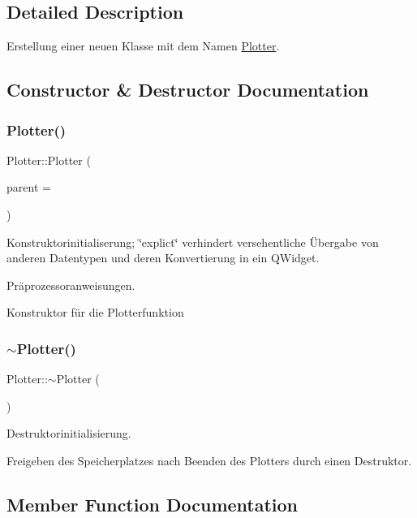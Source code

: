 \subsection{Detailed Description}
Erstellung einer neuen Klasse mit dem Namen \hyperlink{class_plotter}{Plotter}. 

\subsection{Constructor \& Destructor Documentation}
\mbox{\label{class_plotter_a367b6890c36910a27ec710ac3693e64b}} 
\subsubsection{\texorpdfstring{Plotter()}{Plotter()}}
{\footnotesize\ttfamily Plotter\+::\+Plotter (\begin{DoxyParamCaption}\item[{Q\+Widget $\ast$}]{parent = {} }\end{DoxyParamCaption})\hspace{0.3cm}{\ttfamily [explicit]}}



Konstruktorinitialiserung; \char`\"{}explict\char`\"{} verhindert versehentliche Übergabe von anderen Datentypen und deren Konvertierung in ein Q\+Widget. 

Präprozessoranweisungen.

Konstruktor für die Plotterfunktion \mbox{\label{class_plotter_acd0883f9597a6b3bfcca0fce926809a0}} 
\subsubsection{\texorpdfstring{$\sim$\+Plotter()}{~Plotter()}}
{\footnotesize\ttfamily Plotter\+::$\sim$\+Plotter (\begin{DoxyParamCaption}{ }\end{DoxyParamCaption})}



Destruktorinitialisierung. 

Freigeben des Speicherplatzes nach Beenden des Plotters durch einen Destruktor. 

\subsection{Member Function Documentation}
\mbox{\label{class_plotter_ad866f44f28b5bee3b528261560daee2f}} 

